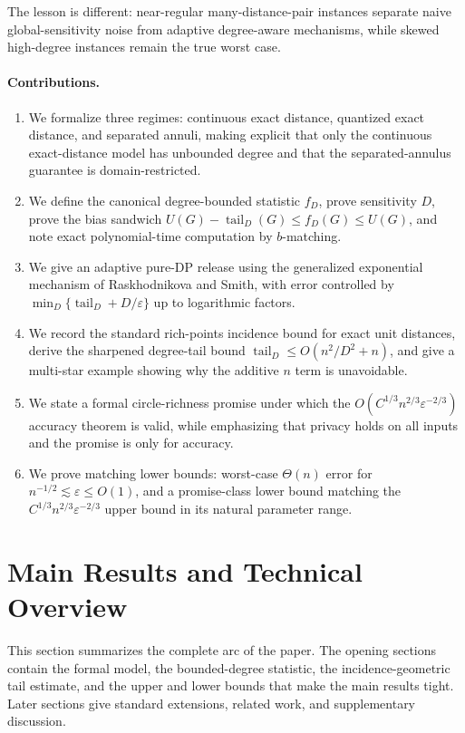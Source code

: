 \documentclass[11pt]{article}
\newcommand{\eps}{\varepsilon}
\newcommand{\tail}{\operatorname{tail}}
\begin{document}
The lesson is different: near-regular many-distance-pair instances separate naive global-sensitivity noise from adaptive degree-aware mechanisms, while skewed high-degree instances remain the true worst case.

\paragraph{Contributions.}
\begin{enumerate}[leftmargin=*]
  \item We formalize three regimes: continuous exact distance, quantized exact distance, and separated annuli, making explicit that only the continuous exact-distance model has unbounded degree and that the separated-annulus guarantee is domain-restricted.
  \item We define the canonical degree-bounded statistic \(f_D\), prove sensitivity \(D\), prove the bias sandwich \(U(G)-\tail_D(G)\le f_D(G)\le U(G)\), and note exact polynomial-time computation by \(b\)-matching.
  \item We give an adaptive pure-DP release using the generalized exponential mechanism of Raskhodnikova and Smith, with error controlled by \(\min_D\{\tail_D+D/\eps\}\) up to logarithmic factors.
  \item We record the standard rich-points incidence bound for exact unit distances, derive the sharpened degree-tail bound \(\tail_D\le O(n^2/D^2+n)\), and give a multi-star example showing why the additive \(n\) term is unavoidable.
  \item We state a formal circle-richness promise under which the \(O(C^{1/3}n^{2/3}\eps^{-2/3})\) accuracy theorem is valid, while emphasizing that privacy holds on all inputs and the promise is only for accuracy.
  \item We prove matching lower bounds: worst-case \(\Theta(n)\) error for \(n^{-1/2}\lesssim\eps\le O(1)\), and a promise-class lower bound matching the \(C^{1/3}n^{2/3}\eps^{-2/3}\) upper bound in its natural parameter range.
\end{enumerate}


\section{Main Results and Technical Overview}
\label{sec:overview}

This section summarizes the complete arc of the paper. The opening sections contain the formal model, the bounded-degree statistic, the incidence-geometric tail estimate, and the upper and lower bounds that make the main results tight. Later sections give standard extensions, related work, and supplementary discussion.
\end{document}
